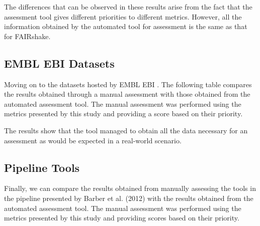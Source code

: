 \documentclass{cisfyp}
\begin{document}
The differences that can be observed in these results arise from the fact that the assessment tool gives different priorities to different metrics. However, all the information obtained by the automated tool for assessment is the same as that for FAIRshake.

\subsection{EMBL EBI Datasets}
Moving on to the datasets hosted by EMBL EBI \cite{ebi}. The following table compares the results obtained through a manual assessment with those obtained from the automated assessment tool. The manual assessment was performed using the metrics presented by this study and providing a score based on their priority.

\begin{table}[h!]
\caption{Comparison of results between manual assessment performed on EMBL EBI datasets and assessment performed by the automated assessment tool.}
\label{tab:my-table}
\end{table}
The results show that the tool managed to obtain all the data necessary for an assessment as would be expected in a real-world scenario.

\subsection{Pipeline Tools}
Finally, we can compare the results obtained from manually assessing the tools in the pipeline presented by Barber et al. (2012) with the results obtained from the automated assessment tool. The manual assessment was performed using the metrics presented by this study and providing scores based on their priority.
\end{document}
